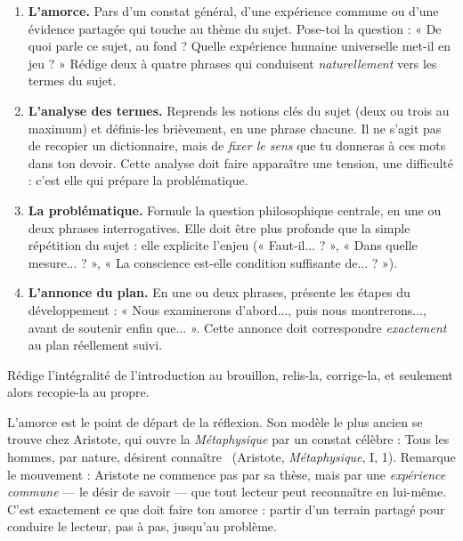 \documentclass[11pt]{article}
\newcounter{popsec}
\newcounter{popsub}
\newcommand{\courssub}[1]{%
  \stepcounter{popsub}%
  \par\vspace{9pt}\noindent{\popxbold\fontsize{11.5}{13}\selectfont\color{popink}{\color{poporange}\thepopsec.\thepopsub}\hspace{6pt}#1}\par\nopagebreak\vspace{4pt}
}
\begin{document}
\begin{methode}
\begin{enumerate}
\item \textbf{L'amorce.} Pars d'un constat général, d'une expérience commune ou d'une évidence partagée qui touche au thème du sujet. Pose-toi la question : « De quoi parle ce sujet, au fond ? Quelle expérience humaine universelle met-il en jeu ? » Rédige deux à quatre phrases qui conduisent \emph{naturellement} vers les termes du sujet.
\item \textbf{L'analyse des termes.} Reprends les notions clés du sujet (deux ou trois au maximum) et définis-les brièvement, en une phrase chacune. Il ne s'agit pas de recopier un dictionnaire, mais de \emph{fixer le sens} que tu donneras à ces mots dans ton devoir. Cette analyse doit faire apparaître une tension, une difficulté : c'est elle qui prépare la problématique.
\item \textbf{La problématique.} Formule la question philosophique centrale, en une ou deux phrases interrogatives. Elle doit être plus profonde que la simple répétition du sujet : elle explicite l'enjeu (« Faut-il... ? », « Dans quelle mesure... ? », « La conscience est-elle condition suffisante de... ? »).
\item \textbf{L'annonce du plan.} En une ou deux phrases, présente les étapes du développement : « Nous examinerons d'abord..., puis nous montrerons..., avant de soutenir enfin que... ». Cette annonce doit correspondre \emph{exactement} au plan réellement suivi.
\end{enumerate}
Rédige l'intégralité de l'introduction au brouillon, relis-la, corrige-la, et seulement alors recopie-la au propre.
\end{methode}

\courssub{Premier moment : l'amorce}

L'amorce est le point de départ de la réflexion. Son modèle le plus ancien se trouve chez Aristote, qui ouvre la \emph{Métaphysique} par un constat célèbre : \guillemotleft Tous les hommes, par nature, désirent connaître \guillemotright\ (Aristote, \emph{Métaphysique}, I, 1). Remarque le mouvement : Aristote ne commence pas par sa thèse, mais par une \emph{expérience commune} — le désir de savoir — que tout lecteur peut reconnaître en lui-même. C'est exactement ce que doit faire ton amorce : partir d'un terrain partagé pour conduire le lecteur, pas à pas, jusqu'au problème.
\end{document}
